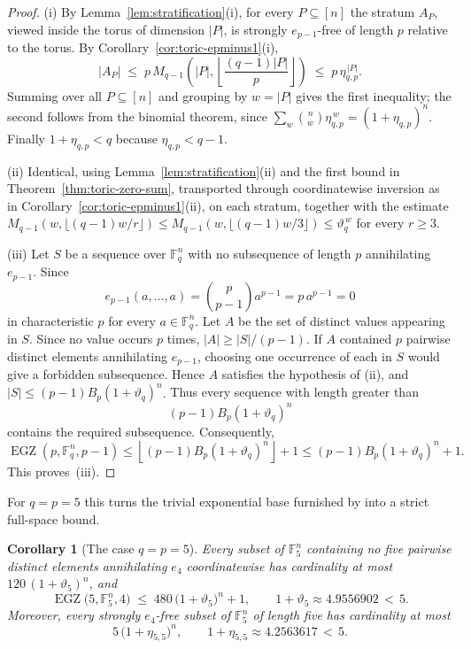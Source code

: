\documentclass[10pt,a4paper]{amsart}
\newtheorem{corollary}[theorem]{Corollary}
\theoremstyle{definition}
\newcommand{\F}{\mathbb F}
\newcommand{\EGZ}{\operatorname{EGZ}}
\newcommand{\1}{\mathbf 1}
\begin{document}
\begin{proof}
(i) By Lemma~\ref{lem:stratification}(i), for every $P\subseteq[n]$ the
stratum $A_P$, viewed inside the torus of dimension $|P|$, is strongly
$e_{p-1}$-free of length $p$ relative to the torus. By Corollary~\ref{cor:toric-epminus1}(i),
\[
|A_P| \;\leq\; p\, M_{q-1}\!\left(|P|,
\left\lfloor\frac{(q-1)|P|}{p}\right\rfloor\right)
\;\leq\; p\,\eta_{q,p}^{\,|P|}.
\]
Summing over all $P\subseteq[n]$ and grouping by $w=|P|$ gives the first
inequality; the second follows from the binomial theorem, since
$\sum_{w}\binom{n}{w}\eta_{q,p}^{\,w}=(1+\eta_{q,p})^{n}$. Finally
$1+\eta_{q,p}<q$ because $\eta_{q,p}<q-1$.

(ii) Identical, using Lemma~\ref{lem:stratification}(ii) and the first bound in Theorem~\ref{thm:toric-zero-sum}, transported through coordinatewise inversion as in Corollary~\ref{cor:toric-epminus1}(ii), on each stratum, together with the estimate
$M_{q-1}(w,\lfloor (q-1)w/r\rfloor)\leq
M_{q-1}(w,\lfloor (q-1)w/3\rfloor)\leq\vartheta_q^{\,w}$ for every $r\geq 3$.

(iii) Let $S$ be a sequence over $\F_q^n$ with no subsequence of length $p$
annihilating $e_{p-1}$. Since
\[
e_{p-1}(a,\dots,a)=\binom{p}{p-1}a^{p-1}=p\,a^{p-1}=0
\]
in characteristic $p$ for every $a\in\F_q^n$.  {Let $A$ be the set of distinct values appearing in $S$.  Since no value occurs $p$ times, $|A|\geq |S|/(p-1)$.} If $A$
contained $p$ pairwise distinct elements annihilating $e_{p-1}$, choosing one
occurrence of each in $S$ would give a forbidden subsequence. Hence $A$
satisfies the hypothesis of (ii), and $|S|\leq (p-1)B_p(1+\vartheta_q)^n$.  {Thus every sequence with length greater than
\[
 (p-1)B_p(1+\vartheta_q)^n
\]
contains the required subsequence.  Consequently,
\[
 \EGZ(p,\F_q^n,p-1)
 \le \left\lfloor (p-1)B_p(1+\vartheta_q)^n\right\rfloor+1
 \le (p-1)B_p(1+\vartheta_q)^n+1.
\]
This proves~\textup{(iii)}.}
\end{proof}

For $q=p=5$ this turns the trivial exponential base furnished by
\cite[Theorem~4.3]{CostaDellaFiore} into a strict full-space bound.

\begin{corollary}[The case $q=p=5$]\label{cor:q5}
Every subset of $\F_5^n$ containing no five pairwise distinct elements
annihilating $e_4$ coordinatewise has cardinality at most
$120\,(1+\vartheta_5)^n$, and
\[
\EGZ\bigl(5,\F_5^n,4\bigr)\;\leq\; 480\,\bigl(1+\vartheta_5\bigr)^{n}+1,
\qquad 1+\vartheta_5\approx 4.9556902 \,<\, 5.
\]
Moreover, every strongly $e_4$-free subset of $\F_5^n$ of length five has
cardinality at most
\[
5\,\bigl(1+\eta_{5,5}\bigr)^{n},
\qquad 1+\eta_{5,5}\approx 4.2563617 \,<\, 5.
\]
\end{corollary}
\end{document}
